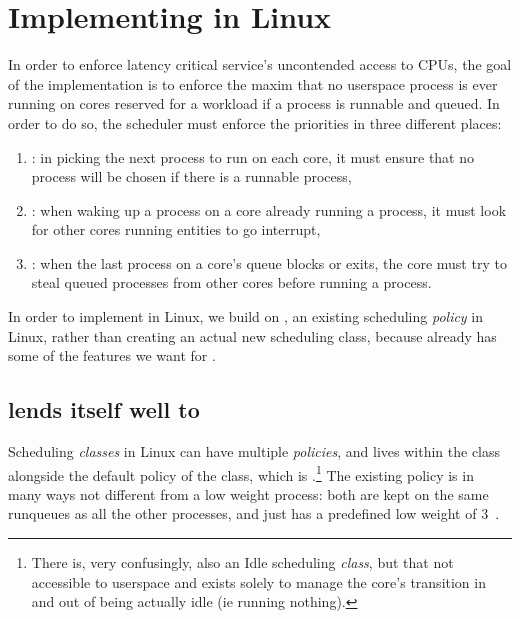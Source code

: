 \section{Implementing \beclass{} in Linux}\label{s:implementation}

In order to enforce latency critical service's uncontended access to CPUs, the
goal of the implementation is to enforce the maxim that no \beclass{} userspace
process is ever running on cores reserved for a \normalclass{} workload if a
\normalclass{} process is runnable and queued. In order to do so, the scheduler
must enforce the priorities in three different places:
\begin{enumerate}
    \item \local: in picking the next process to run on each core, it must ensure
        that no \beclass{} process will be chosen if there is a runnable
        \normalclass{} process,
    \item \entry: when waking up a \normalclass{} process on a core already
        running a \normalclass{} process, it must look for other cores running
        \beclass{} entities to go interrupt,
    \item \exit: when the last \normalclass{} process on a core's queue blocks
        or exits, the core must try to steal queued \normalclass{} processes from
        other cores before running a \beclass{} process.
\end{enumerate}

In order to implement \beclass{} in Linux, we build on \schedidle{}, an existing
scheduling \textit{policy} in Linux, rather than creating an actual new
scheduling class, because \schedidle{} already has some of the features we want
for \beclass{}.

\subsection{\schedidle{} lends itself well to \beclass{}}

Scheduling \textit{classes} in Linux can have multiple \textit{policies}, and
\schedidle{} lives within the \normalclass{} class alongside the default policy
of the \normalclass{} class, which is \schednormal{}.\footnote{There is, very
confusingly, also an Idle scheduling \textit{class}, but that not accessible to
userspace and exists solely to manage the core's transition in and out of being
actually idle (ie running nothing).} The existing \schedidle{} policy is in many
ways not different from a low weight \schednormal{} process: both are kept on
the same runqueues as all the other \schednormal{} processes, and \schedidle{}
just has a predefined low weight of 3~\cite{weight-idleprio}.

